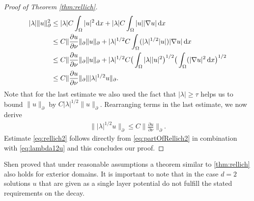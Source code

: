 \begin{proof}[Proof of Theorem \ref{thm:rellich}]
  \begin{align*}
    |\lambda| \|u\|_\partial^2 
    &\leq |\lambda| C \int_\Omega |u|^2 \, {\operatorname{d}\!{x}} + |\lambda| C \int_\Omega |u| |\nabla u| \, {\operatorname{d}\!{x}} \nonumber\\
    &\leq C \| \frac{\partial u}{\partial \nu} \|_\partial \|u\|_\partial + |\lambda|^{1/2} C \int_\Omega (|\lambda|^{1/2} |u|) |\nabla u| \, {\operatorname{d}\!{x}} \\
    &\leq C \|\frac{\partial u}{\partial \nu} \|_\partial \|u\|_\partial + |\lambda|^{1/2} C \big( \int_\Omega |\lambda| |u|^2 \big)^{1/2} \big( \int_\Omega (|\nabla u|^2 \, {\operatorname{d}\!{x}} \big)^{1/2} \\
    &\leq C \|\frac{\partial u}{\partial \nu} \|_\partial \||\lambda|^{1/2} u\|_\partial.
  \end{align*}
  Note that for the last estimate we also used the fact that $|\lambda| \geq \tau$ helps us to bound $\|u\|_\partial$ by $C |\lambda|^{1/2} \|u\|_\partial$.
  Rearranging terms in the last estimate, we now derive
  \begin{align}
    \label{eq:lambda12u}
    \| |\lambda|^{1/2} u\|_\partial \leq C \| \frac{\partial u}{\partial \nu} \|_\partial.
  \end{align}
  Estimate \eqref{eq:rellich2} follows directly from \eqref{eq:partOfRellich2} in combination with \eqref{eq:lambda12u} and this concludes our proof.
\end{proof}

Shen proved that under reasonable assumptions a theorem similar to \ref{thm:rellich} also holds for exterior domains.
It is important to note that in the case $d = 2$ solutions $u$ that are given as a single layer potential do not fulfill the stated requirements on the decay.

